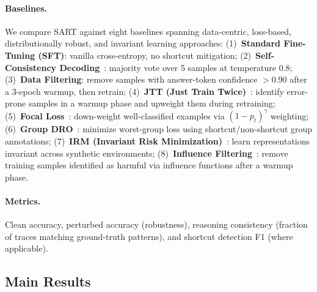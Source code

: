 \paragraph{Baselines.}
We compare SART against eight baselines spanning data-centric, loss-based, distributionally robust, and invariant learning approaches:
(1)~\textbf{Standard Fine-Tuning (SFT)}: vanilla cross-entropy, no shortcut mitigation;
(2)~\textbf{Self-Consistency Decoding}~\cite{wang2023selfconsistency}: majority vote over 5 samples at temperature 0.8;
(3)~\textbf{Data Filtering}: remove samples with answer-token confidence $> 0.90$ after a 3-epoch warmup, then retrain;
(4)~\textbf{JTT (Just Train Twice)}~\cite{liu2021just}: identify error-prone samples in a warmup phase and upweight them during retraining;
(5)~\textbf{Focal Loss}~\cite{lin2017focal}: down-weight well-classified examples via $(1-p_t)^\gamma$ weighting;
(6)~\textbf{Group DRO}~\cite{sagawa2020distributionally}: minimize worst-group loss using shortcut/non-shortcut group annotations;
(7)~\textbf{IRM (Invariant Risk Minimization)}~\cite{arjovsky2019invariant}: learn representations invariant across synthetic environments;
(8)~\textbf{Influence Filtering}~\cite{koh2017understanding}: remove training samples identified as harmful via influence functions after a warmup phase.

\paragraph{Metrics.}
Clean accuracy, perturbed accuracy (robustness), reasoning consistency (fraction of traces matching ground-truth patterns), and shortcut detection F1 (where applicable).

\subsection{Main Results}
\label{sec:exp_main}

